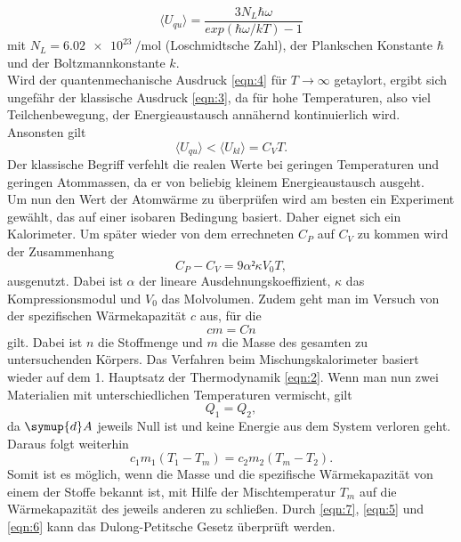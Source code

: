 \begin{equation}
  \langle U_{qu} \rangle = \frac{3N_L\hbar\omega}{exp(\hbar\omega/kT)-1}
  \label{eqn:4}
\end{equation}
mit $N_L = \SI{6,02e23}{\per\mol}$ (Loschmidtsche Zahl), der Plankschen Konstante $\hbar$ und der Boltzmannkonstante $k$.\\
Wird der quantenmechanische Ausdruck \ref{eqn:4} für $T\to\infty $ getaylort, ergibt sich ungefähr der klassische Ausdruck \ref{eqn:3}, da für hohe Temperaturen, also viel Teilchenbewegung, der Energieaustausch annähernd kontinuierlich wird.
Ansonsten gilt
\begin{equation}
  \langle U_{qu} \rangle < \langle U_{kl} \rangle = C_VT.
\end{equation}
Der klassische Begriff verfehlt die realen Werte bei geringen Temperaturen und geringen Atommassen, da er von beliebig kleinem Energieaustausch ausgeht.\\
Um nun den Wert der Atomwärme zu überprüfen wird am besten ein Experiment gewählt, das auf einer isobaren Bedingung basiert.
Daher eignet sich ein Kalorimeter.
Um später wieder von dem errechneten $C_P$ auf $C_V$ zu kommen wird der Zusammenhang
\begin{equation}
  C_P - C_V = 9 \alpha² \kappa V_0 T,
  \label{eqn:5}
\end{equation}
ausgenutzt.
Dabei ist $\alpha$ der lineare Ausdehnungskoeffizient, $\kappa$ das Kompressionsmodul und $V_0$ das Molvolumen.
Zudem geht man im Versuch von der spezifischen Wärmekapazität $c$ aus, für die
\begin{equation}
  cm = Cn
  \label{eqn:6}
\end{equation}
gilt.
Dabei ist $n$ die Stoffmenge und $m$ die Masse des gesamten zu untersuchenden Körpers.
Das Verfahren beim Mischungskalorimeter basiert wieder auf dem 1. Hauptsatz der Thermodynamik \ref{eqn:2}.
Wenn man nun zwei Materialien mit unterschiedlichen Temperaturen vermischt, gilt
\begin{equation}
  Q_1 = Q_2,
\end{equation}
da $\symup{d}A$ jeweils Null ist und keine Energie aus dem System verloren geht.
Daraus folgt weiterhin
\begin{equation}
  c_1m_1(T_1-T_m) = c_2m_2(T_m-T_2).
  \label{eqn:7}
\end{equation}
Somit ist es möglich, wenn die Masse und die spezifische Wärmekapazität von einem der Stoffe bekannt ist, mit Hilfe der Mischtemperatur $T_m$ auf die Wärmekapazität des jeweils anderen zu schließen.
Durch \ref{eqn:7}, \ref{eqn:5} und \ref{eqn:6} kann das Dulong-Petitsche Gesetz überprüft werden.


\cite{sample}
